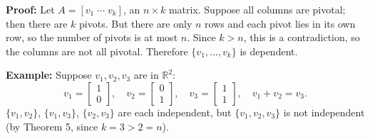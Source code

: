 \documentclass{article}
\begin{document}
\medskip

\textbf{Proof:} Let $A = [v_1 \; \cdots \; v_k]$, an $n \times k$ matrix. Suppose all columns are pivotal; then there are $k$ pivots. But there are only $n$ rows and each pivot lies in its own row, so the number of pivots is at most $n$. Since $k > n$, this is a contradiction, so the columns are not all pivotal. Therefore $\{v_1, \ldots, v_k\}$ is dependent.

\bigskip

\textbf{Example:} Suppose $v_1, v_2, v_3$ are in $\mathbb{R}^2$:
\[
v_1 = \begin{bmatrix} 1 \\ 0 \end{bmatrix}, \quad v_2 = \begin{bmatrix} 0 \\ 1 \end{bmatrix}, \quad v_3 = \begin{bmatrix} 1 \\ 1 \end{bmatrix}, \quad v_1 + v_2 = v_3.
\]
$\{v_1, v_2\}$, $\{v_1, v_3\}$, $\{v_2, v_3\}$ are each independent, but $\{v_1, v_2, v_3\}$ is not independent (by Theorem 5, since $k = 3 > 2 = n$).
\end{document}
